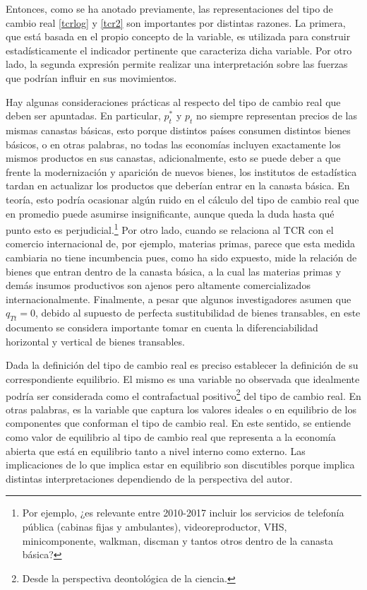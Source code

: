 \documentclass[12pt,letterpaper]{article}
\begin{document}
Entonces, como se ha anotado previamente, las representaciones del tipo de cambio real \ref{tcrlog} y \ref{tcr2} son importantes por distintas razones. La primera, que está basada en el propio concepto de la variable, es utilizada para construir estadísticamente el indicador pertinente que caracteriza dicha variable. Por otro lado, la segunda expresión permite realizar una interpretación sobre las fuerzas que podrían influir en sus movimientos.

Hay algunas consideraciones prácticas al respecto del tipo de cambio real que deben ser apuntadas. En particular, $p_t^*$ y $p_t$ no siempre representan precios de las mismas canastas básicas, esto porque distintos países consumen distintos bienes básicos, o en otras palabras, no todas las economías incluyen exactamente los mismos productos en sus canastas, adicionalmente, esto se puede deber a que frente la modernización y aparición de nuevos bienes, los institutos de estadística tardan en actualizar los productos que deberían entrar en la canasta básica. En teoría, esto podría ocasionar algún ruido en el cálculo del tipo de cambio real que en promedio puede asumirse insignificante, aunque queda la duda hasta qué punto esto es perjudicial.\footnote{Por ejemplo, ¿es relevante entre 2010-2017 incluir los servicios de telefonía pública (cabinas fijas y ambulantes), videoreproductor, VHS, minicomponente, walkman, discman y tantos otros dentro de la canasta básica?} Por otro lado, cuando se relaciona al TCR con el comercio internacional de, por ejemplo, materias primas, parece que esta medida cambiaria no tiene incumbencia pues, como ha sido expuesto, mide la relación de bienes que entran dentro de la canasta básica, a la cual las materias primas y demás insumos productivos son ajenos pero altamente comercializados internacionalmente. Finalmente, a pesar que algunos investigadores asumen que $q_{Tt}=0$, debido al supuesto de perfecta sustitubilidad de bienes transables, en este documento se considera importante tomar en cuenta la diferenciabilidad horizontal y vertical de bienes transables.

Dada la definición del tipo de cambio real es preciso establecer la definición de su correspondiente equilibrio. El mismo es una variable no observada que idealmente podría ser considerada como el contrafactual positivo\footnote{Desde la perspectiva deontológica de la ciencia.} del tipo de cambio real. En otras palabras, es la variable que captura los valores ideales o en equilibrio de los componentes que conforman el tipo de cambio real. En este sentido, se entiende como valor de equilibrio al tipo de cambio real que representa a la economía abierta que está en equilibrio tanto a nivel interno como externo. Las implicaciones de lo que implica estar en equilibrio son discutibles porque implica distintas interpretaciones dependiendo de la perspectiva del autor.
\end{document}
